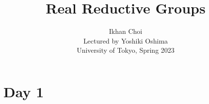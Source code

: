 \documentclass{../../small}
\begin{document}
\title{Real Reductive Groups}
\author{Ikhan Choi\\Lectured by Yoshiki Oshima\\University of Tokyo, Spring 2023}
\maketitle
\tableofcontents

\newpage
\section{Day 1}
\end{document}
